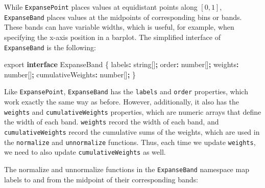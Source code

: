 \documentclass[
]{book}
\newenvironment{Shaded}{\begin{snugshade}}{\end{snugshade}}
\newcommand{\DataTypeTok}[1]{\textcolor[rgb]{0.13,0.29,0.53}{#1}}
\newcommand{\ImportTok}[1]{#1}
\newcommand{\KeywordTok}[1]{\textcolor[rgb]{0.13,0.29,0.53}{\textbf{#1}}}
\newcommand{\NormalTok}[1]{#1}
\newcommand{\OperatorTok}[1]{\textcolor[rgb]{0.81,0.36,0.00}{\textbf{#1}}}
\theoremstyle{definition}
\theoremstyle{definition}
\theoremstyle{definition}
\theoremstyle{definition}
\theoremstyle{remark}
\begin{document}
While \texttt{ExpansePoint} places values at equidistant points along \([0, 1]\), \texttt{ExpanseBand} places values at the midpoints of corresponding bins or bands. These bands can have variable widths, which is useful, for example, when specifying the x-axis position in a barplot. The simplified interface of \texttt{ExpanseBand} is the following:

\begin{Shaded}
\begin{Highlighting}[]
\ImportTok{export} \KeywordTok{interface}\NormalTok{ ExpanseBand \{}
\NormalTok{  labels}\OperatorTok{:} \DataTypeTok{string}\NormalTok{[]}\OperatorTok{;}
\NormalTok{  order}\OperatorTok{:} \DataTypeTok{number}\NormalTok{[]}\OperatorTok{;}
\NormalTok{  weights}\OperatorTok{:} \DataTypeTok{number}\NormalTok{[]}\OperatorTok{;}
\NormalTok{  cumulativeWeights}\OperatorTok{:} \DataTypeTok{number}\NormalTok{[]}\OperatorTok{;}
\NormalTok{\}}
\end{Highlighting}
\end{Shaded}

Like \texttt{ExpansePoint}, \texttt{ExpanseBand} has the \texttt{labels} and \texttt{order} properties, which work exactly the same way as before. However, additionally, it also has the \texttt{weights} and \texttt{cumulativeWeights} properties, which are numeric arrays that define the width of each band. \texttt{weights} record the width of each band, and \texttt{cumulativeWeights} record the cumulative sums of the weights, which are used in the \texttt{normalize} and \texttt{unnormalize} functions. Thus, each time we update \texttt{weights}, we need to also update \texttt{cumulativeWeights} as well.

The normalize and unnormalize functions in the \texttt{ExpanseBand} namespace map labels to and from the midpoint of their corresponding bands:
\end{document}
